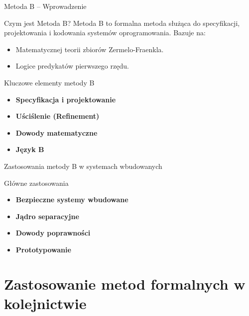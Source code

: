 \documentclass{beamer}
\begin{document}
\begin{frame}{Metoda B – Wprowadzenie}
  \begin{block}{Czym jest Metoda B?}
    Metoda B to formalna metoda służąca do specyfikacji, projektowania i kodowania systemów oprogramowania. Bazuje na:
    \begin{itemize}
      \item Matematycznej teorii zbiorów Zermelo-Fraenkla.
      \item Logice predykatów pierwszego rzędu.
    \end{itemize}
  \end{block}
  
  \begin{block}{Kluczowe elementy metody B}
  \begin{itemize}
    \item \textbf{Specyfikacja i projektowanie}
    \item \textbf{Uściślenie (Refinement)}
    \item \textbf{Dowody matematyczne}
    \item \textbf{Język B}
  \end{itemize}
  \end{block}
\end{frame}

\begin{frame}{Zastosowania metody B w systemach wbudowanych}
  \begin{block}{Główne zastosowania}
  \begin{itemize}
    \item \textbf{Bezpieczne systemy wbudowane}
    \item \textbf{Jądro separacyjne}
    \item \textbf{Dowody poprawności}
    \item \textbf{Prototypowanie}
  \end{itemize}
  \end{block}
\end{frame}

\section{Zastosowanie metod formalnych w kolejnictwie}
\end{document}

